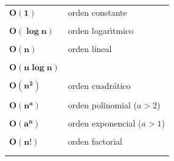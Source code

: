 \documentclass[ebook,oneside]{memoir}
\newcommand{\bolds}[1]{\boldsymbol{#1}}
\begin{document}
 \vspace{0.4cm}

        \begin{tabular}{ll}
              \vspace{-0.2cm}
            $\bolds{O(1)}$ & orden constante \\ \\
              \vspace{-0.2cm}
            $\bolds{O(\log n)}$ & orden logar\'{\i}tmico \\ \\
              \vspace{-0.2cm}
            $\bolds{O(n)}$ & orden lineal \\ \\
              \vspace{-0.2cm}
            $\bolds{O(n\log n)}$ &  \\ \\
              \vspace{-0.2cm}
            $\bolds{O(n^2)}$ & orden cuadr\'{a}tico \\ \\
              \vspace{-0.2cm}
            $\bolds{O(n^a)}$ & orden polinomial ($a>2$) \\ \\
              \vspace{-0.2cm}
            $\bolds{O(a^n)}$ & orden exponencial ($a>1$) \\ \\
              \vspace{-0.2cm}
            $\bolds{O(n!)}$ & orden factorial \\ \\
              \vspace{-0.2cm}
        \end{tabular}
\end{document}
